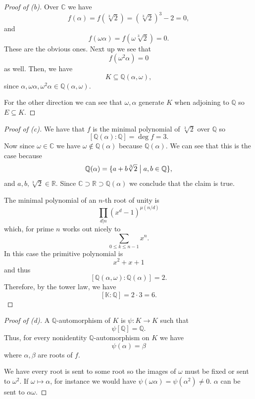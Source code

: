 \begin{proof}[Proof of (b)]
    Over $\mathbb C$ we have 
    \[
        f(\alpha) = f(\sqrt[3]2) = (\sqrt[3]2)^3 - 2 = 0, 
    \]
    and 
    \[
        f(\omega\alpha) = f(\omega\sqrt[3]2) = 0.  
    \]
    These are the obvious ones. Next up we see that 
    \[
        f(\omega^2\alpha) = 0
    \]
    as well.
    Then, we have 
    \[
        K \subseteq \mathbb Q(\alpha, \omega),
    \]
    since $\alpha,\omega\alpha,\omega^2\alpha \in 
    \mathbb Q(\alpha,\omega)$.
    
    For the other direction we can see that 
    $\omega,\alpha$ generate $K$ when 
    adjoining to $\mathbb Q$ so 
    $E \subseteq K$. 
\end{proof}
\begin{proof}[Proof of (c)]
    We have that 
    $f$ is the minimal polynomial 
    of $\sqrt[3]2$ over $\mathbb Q$ so 
    \[
        [\mathbb Q(\alpha) : \mathbb Q] = 
        \deg f = 3. 
    \]
    Now since $\omega \in \mathbb C$ 
    we have $\omega \not\in \mathbb Q(\alpha)$ 
    because $\mathbb Q(\alpha)$. 
    We can see that this is the case because 
    \[
        \mathbb Q(\alpha) 
        = \{a + b\sqrt[3]2 \bigm| a,b \in \mathbb Q\}, 
    \]
    and $a,b,\sqrt[3]2 \in \mathbb R$. 
    Since $\mathbb C \supset 
    \mathbb R\supset \mathbb Q(\alpha)$ we conclude 
    that the claim is true.

    The minimal polynomial of an 
    $n$-th root of unity is 
    \[
        \prod_{d| n}(x^d - 1)^{\mu(n/d)}
    \]
    which, for prime $n$ works out nicely to 
    \[
        \sum_{0 \leq k \leq n-1} x^n. 
    \]
    In this case the primitive polynomial is 
    \[
        x^2 + x + 1
    \]
    and thus 
    \[
        [\mathbb Q(\alpha,\omega) : \mathbb Q(\alpha)] = 2. 
    \]
    Therefore, by the tower law, we have 
    \[
        [\mathbb K : \mathbb Q] = 2 \cdot 3 = 6.
    \]
\end{proof}
\begin{proof}[Proof of (d)]
    A $\mathbb Q$-automorphism of $K$ 
    is $\psi : K \to K$ such that 
    \[
        \psi[\mathbb Q] = \mathbb Q. 
    \]
    Thus, for every nonidentity $\mathbb Q$-automorphism 
    on $K$ we have 
    \[
        \psi(\alpha) = \beta
    \]
    where $\alpha,\beta$ are roots of $f$. 

    We have every root is sent to some root so 
    the images of $\omega$ must be fixed 
    or sent to $\omega^2$. If $\omega \mapsto 
    \alpha$, for instance we would have 
    $\psi(\omega\alpha) = \psi(\alpha^2) \neq 0$. 
    $\alpha$ can be sent to $\alpha\omega$. 
\end{proof}
